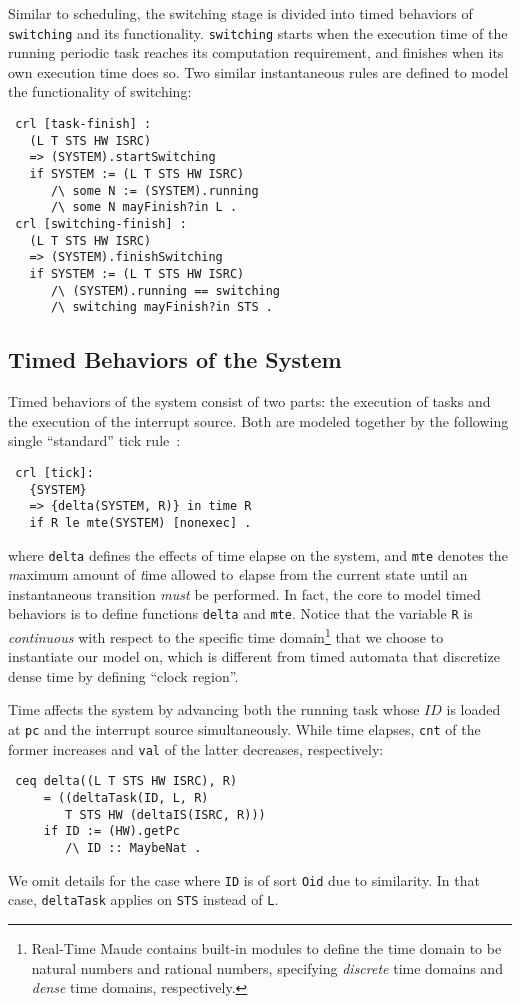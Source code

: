 \documentclass[10pt,journal]{IEEEtran}
\begin{document}
Similar to scheduling, the switching stage is divided into timed
behaviors of \verb|switching| and its functionality. \verb|switching|
starts when the execution time of the running periodic task reaches
its computation requirement, and finishes when its own execution time
does so. Two similar instantaneous rules are defined to model the
functionality of switching:
\begin{verbatim}
 crl [task-finish] :
   (L T STS HW ISRC) 
   => (SYSTEM).startSwitching
   if SYSTEM := (L T STS HW ISRC)
      /\ some N := (SYSTEM).running
      /\ some N mayFinish?in L .
 crl [switching-finish] :
   (L T STS HW ISRC) 
   => (SYSTEM).finishSwitching
   if SYSTEM := (L T STS HW ISRC)
      /\ (SYSTEM).running == switching
      /\ switching mayFinish?in STS .
\end{verbatim}

\subsection{Timed Behaviors of the System}
\label{ss:timedbehavior}
Timed behaviors of the system consist of two parts: the execution of
tasks and the execution of the interrupt source. Both are modeled
together by the following single ``standard'' tick
rule~\cite{DBLP:journals/entcs/OlveczkyM07a}:
\begin{verbatim}
 crl [tick]:
   {SYSTEM} 
   => {delta(SYSTEM, R)} in time R 
   if R le mte(SYSTEM) [nonexec] .
\end{verbatim}
where \verb|delta| defines the effects of time elapse on the system,
and \verb|mte| denotes the \emph{m}aximum amount of \emph{t}ime
allowed to \emph{e}lapse from the current state until an instantaneous
transition \emph{must} be performed. In fact, the core to model timed
behaviors is to define functions \verb|delta| and \verb|mte|. Notice
that the variable \verb|R| is \emph{continuous} with respect to the
specific time domain\footnote{Real-Time Maude contains built-in
  modules to define the time domain to be natural numbers and rational
  numbers, specifying \emph{discrete} time domains and \emph{dense}
  time domains, respectively.}  that we choose to instantiate our
model on, which is different from timed automata that discretize dense
time by defining ``clock region''.

Time affects the system by advancing both the running task whose $ID$
is loaded at \verb|pc| and the interrupt source simultaneously.  While
time elapses, \verb|cnt| of the former increases and \verb|val| of the
latter decreases, respectively:
\begin{verbatim}
 ceq delta((L T STS HW ISRC), R)
     = ((deltaTask(ID, L, R) 
        T STS HW (deltaIS(ISRC, R)))
     if ID := (HW).getPc 
        /\ ID :: MaybeNat .
\end{verbatim}
We omit details for the case where \verb|ID| is of sort \verb|Oid| due
to similarity. In that case, \verb|deltaTask| applies on \verb|STS|
instead of \verb|L|.
\end{document}
